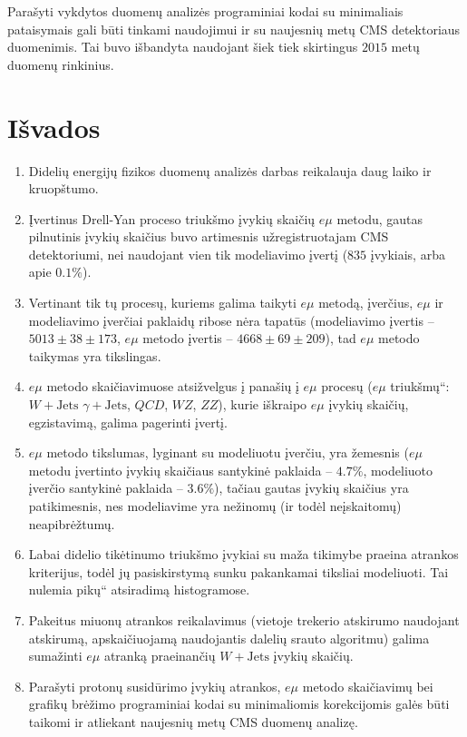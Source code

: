 \documentclass[a4paper, 12pt]{article}
\newcommand{\ZZ}{Z\! Z}
\newcommand{\WZ}{W\! Z}
\newcommand{\gJets}{\gamma\! +\!\mathrm{Jets}}
\newcommand{\WJets}{W\! +\!\mathrm{Jets}}
\newcommand{\ltq}[1]{{\quotedblbase{}#1\textquotedblleft{}}}
\newcommand{\QCD}{QC\! D}
\newlength\q
\begin{document}
Parašyti vykdytos duomenų analizės programiniai kodai su minimaliais pataisymais gali būti tinkami naudojimui ir su naujesnių metų CMS detektoriaus duomenimis. Tai buvo išbandyta naudojant šiek tiek skirtingus $2015$ metų duomenų rinkinius.

\clearpage
\section*{Išvados} 
\begin{enumerate}
\item Didelių energijų fizikos duomenų analizės darbas reikalauja daug laiko ir kruopštumo.
\item Įvertinus Drell-Yan proceso triukšmo įvykių skaičių $e\mu$ metodu, gautas pilnutinis įvykių skaičius buvo artimesnis užregistruotajam CMS detektoriumi, nei naudojant vien tik modeliavimo įvertį ($835$ įvykiais, arba apie $0.1\%$).
\item Vertinant tik tų procesų, kuriems galima taikyti $e\mu$ metodą, įverčius, $e\mu$ ir modeliavimo įverčiai paklaidų ribose nėra tapatūs (modeliavimo įvertis -- $5013\pm38\pm173$, $e\mu$ metodo įvertis -- $4668\pm69\pm209$), tad $e\mu$ metodo taikymas yra tikslingas.
\item $e\mu$ metodo skaičiavimuose atsižvelgus į panašių į $e\mu$ procesų (\ltq{$e\mu$ triukšmų}: $\WJets$ $\gJets$, $\QCD$, $\WZ$, $\ZZ$), kurie iškraipo $e\mu$ įvykių skaičių, egzistavimą, galima pagerinti įvertį.
\item $e\mu$ metodo tikslumas, lyginant su modeliuotu įverčiu, yra žemesnis ($e\mu$ metodu įvertinto įvykių skaičiaus santykinė paklaida -- $4.7\%$, modeliuoto įverčio santykinė paklaida -- $3.6\%$), tačiau gautas įvykių skaičius yra patikimesnis, nes modeliavime yra nežinomų (ir todėl neįskaitomų) neapibrėžtumų.
\item Labai didelio tikėtinumo triukšmo įvykiai su maža tikimybe praeina atrankos kriterijus, todėl jų pasiskirstymą sunku pakankamai tiksliai modeliuoti. Tai nulemia \ltq{pikų} atsiradimą histogramose.
\item Pakeitus miuonų atrankos reikalavimus (vietoje trekerio atskirumo naudojant atskirumą, apskaičiuojamą naudojantis dalelių srauto algoritmu) galima sumažinti $e\mu$ atranką praeinančių $\WJets$ įvykių skaičių.
\item Parašyti protonų susidūrimo įvykių atrankos, $e\mu$ metodo skaičiavimų bei grafikų brėžimo programiniai kodai su minimaliomis korekcijomis galės būti taikomi ir atliekant naujesnių metų CMS duomenų analizę.
\end{enumerate}
\end{document}
